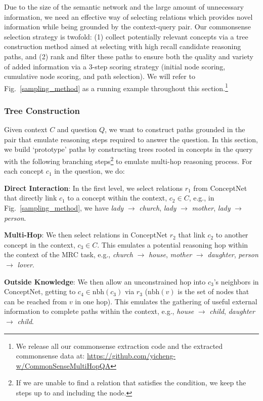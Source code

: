 \documentclass[11pt,a4paper]{article}
\def\figref#1{Fig.~\ref{#1}}
\begin{document}
Due to the size of the semantic network and the large amount of unnecessary information, we need an effective way of selecting relations which provides novel information while being grounded by the context-query pair. Our commonsense selection strategy is twofold: (1) collect potentially relevant concepts via a tree construction method aimed at selecting with high recall candidate reasoning paths, and (2) rank and filter these paths to ensure both the quality and variety of added information via a 3-step scoring strategy (initial node scoring, cumulative node scoring, and path selection).  We will refer to \figref{sampling_method} as a running example throughout this section.\footnote{We release all our commonsense extraction code and the extracted commonsense data at: \scriptsize{\url{https://github.com/yicheng-w/CommonSenseMultiHopQA}}}

\subsubsection{Tree Construction}
Given context $C$ and question $Q$,
we want to construct paths grounded in the pair that emulate reasoning steps required to answer the question.
In this section, we build `prototype' paths by constructing trees rooted in concepts in the query with the following branching steps\footnote{If we are unable to find a relation that satisfies the condition, we keep the steps up to and including the node.} to emulate multi-hop reasoning process. For each concept $c_1$ in the question, we do: 

\noindent\textbf{Direct Interaction}:
In the first level, we select relations $r_1$ from ConceptNet that directly link $c_1$ to a concept within the context, $c_2 \in C$, e.g., in \figref{sampling_method}, we have {\it lady} $\rightarrow$ {\it church}, {\it lady} $\rightarrow$ {\it mother}, {\it lady} $\rightarrow$ {\it person}.

\noindent\textbf{Multi-Hop}:
We then select relations in ConceptNet $r_2$ that link $c_2$ to another concept in the context, $c_3 \in C$. This emulates a potential reasoning hop within the context of the MRC task, e.g., {\it church} $\rightarrow$ {\it house}, {\it mother}  $\rightarrow$ {\it daughter}, {\it person}  $\rightarrow$ {\it lover}.
    
\noindent\textbf{Outside Knowledge}:
We then allow an unconstrained hop into $c_3$'s neighbors in ConceptNet, getting to $c_4 \in \text{nbh}(c_3)$ via $r_3$ ($\text{nbh}(v)$ is the set of nodes that can be reached from $v$ in one hop). This emulates the gathering of useful external information to complete paths within the context, e.g., {\it house} $\rightarrow$ {\it child}, {\it daughter} $\rightarrow$ {\it child}.
    
\end{document}
